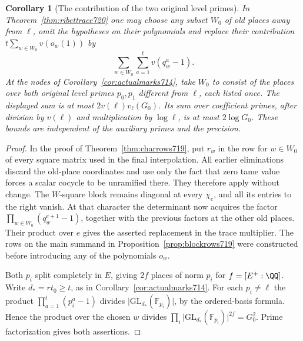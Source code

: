 \documentclass[a4paper,11pt]{article}
\newtheorem{corollary}[proposition]{Corollary}
\theoremstyle{definition}
\theoremstyle{remark}
\numberwithin{equation}{section}
\begin{document}
\begin{corollary}[The contribution of the two original level primes]
\leavevmode\label{cor:levelcost725}
In Theorem~\ref{thm:ribettrace720} one may choose any subset \(W_0\)
of old places away from \(\ell\), omit the hypotheses on their
polynomials and replace their contribution \(t\sum_{w\in W_0}v(o_w(1))\)
by
\[
                  \sum_{w\in W_0}\sum_{a=1}^t v(q_w^a-1).
\]
At the nodes of Corollary~\ref{cor:actualmarks714}, take \(W_0\) to
consist of the places over both original level primes \(p_0,p_1\)
different from \(\ell\), each listed once. The displayed sum is at most
\(2v(\ell)v_\ell(G_0)\). Its sum over coefficient primes, after division
by \(v(\ell)\) and multiplication by \(\log\ell\), is at most
\(2\log G_0\). These bounds are independent of the auxiliary primes
and the precision.
\end{corollary}
\begin{proof}
In the proof of Theorem~\ref{thm:charrows719}, put \(r_w\) in the row
for \(w\in W_0\) of every square matrix used in the final interpolation.
All earlier eliminations discard the old-place coordinates and use
only the fact that zero tame value forces a scalar cocycle to be
unramified there. They therefore apply without change. The \(W\)-square
block remains diagonal at every \(\chi_e\), and all its entries to the
right vanish. At that character the determinant now acquires the factor
\(\prod_{w\in W_0}(q_w^{e+1}-1)\), together with the previous factors at
the other old places. Their product over \(e\) gives the asserted
replacement in the trace multiplier. The rows on the main summand in
Proposition~\ref{prop:blockrows719} were constructed before introducing
any of the polynomials \(o_w\).

Both \(p_i\) split completely in \(E\), giving \(2f\) places of norm
\(p_i\) for \(f=[E^+:\QQ]\). Write \(d_*=rt_0\ge t\), as in
Corollary~\ref{cor:actualmarks714}. For each \(p_i\ne\ell\) the product
\(\prod_{a=1}^t(p_i^a-1)\) divides
\(\lvert\mathrm{GL}_{d_*}(\mathbb F_{p_i})\rvert\), by the ordered-basis
formula. Hence the product over the chosen \(w\) divides
\(\prod_i\lvert\mathrm{GL}_{d_*}(\mathbb F_{p_i})\rvert^{2f}=G_0^2\).
Prime factorization gives both assertions.
\end{proof}
\end{document}
